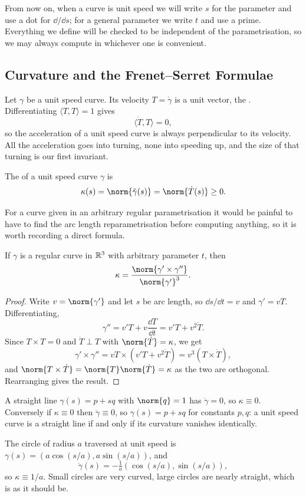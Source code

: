 \documentclass[a4paper]{scrartcl}
\begin{document}
From now on, when a curve is unit speed we will write $s$ for the parameter and use a dot for $\dd/\dd s$; for a general parameter we write $t$ and use a prime. Everything we define will be checked to be independent of the parametrisation, so we may always compute in whichever one is convenient.

\subsection{Curvature and the Frenet--Serret Formulae}

Let $\gamma$ be a unit speed curve. Its velocity $T = \dot\gamma$ is a unit vector, the . Differentiating $\langle T, T \rangle = 1$ gives
$$
\langle \dot T, T \rangle = 0,
$$
so the acceleration of a unit speed curve is always perpendicular to its velocity. All the acceleration goes into turning, none into speeding up, and the size of that turning is our first invariant.

\begin{definition}[Curvature]
    The  of a unit speed curve $\gamma$ is
    $$
    \kappa(s) = \norm{\ddot\gamma(s)} = \norm{\dot T(s)} \geq 0.
    $$
\end{definition}

For a curve given in an arbitrary regular parametrisation it would be painful to have to find the arc length reparametrisation before computing anything, so it is worth recording a direct formula.

\begin{proposition}
    If $\gamma$ is a regular curve in $\mathbb{R}^3$ with arbitrary parameter $t$, then
    $$
    \kappa = \frac{\norm{\gamma' \times \gamma''}}{\norm{\gamma'}^3}.
    $$
\end{proposition}
\begin{proof}
    Write $v = \norm{\gamma'}$ and let $s$ be arc length, so $\dd s/\dd t = v$ and $\gamma' = v T$. Differentiating,
    $$
    \gamma'' = v' T + v \frac{\dd T}{\dd t} = v' T + v^2 \dot T.
    $$
    Since $T \times T = 0$ and $\dot T \perp T$ with $\norm{\dot T} = \kappa$, we get
    $$
    \gamma' \times \gamma'' = v T \times (v' T + v^2 \dot T) = v^3 (T \times \dot T),
    $$
    and $\norm{T \times \dot T} = \norm{T}\norm{\dot T} = \kappa$ as the two are orthogonal. Rearranging gives the result.
\end{proof}

\begin{example}
    A straight line $\gamma(s) = p + s q$ with $\norm{q} = 1$ has $\ddot\gamma = 0$, so $\kappa \equiv 0$. Conversely if $\kappa \equiv 0$ then $\ddot \gamma \equiv 0$, so $\gamma(s) = p + sq$ for constants $p, q$: a unit speed curve is a straight line if and only if its curvature vanishes identically.

    The circle of radius $a$ traversed at unit speed is $\gamma(s) = (a \cos(s/a), a \sin(s/a))$, and
    $$
    \ddot\gamma(s) = -\tfrac{1}{a}\left(\cos(s/a), \sin(s/a)\right),
    $$
    so $\kappa \equiv 1/a$. Small circles are very curved, large circles are nearly straight, which is as it should be.
\end{example}
\end{document}
